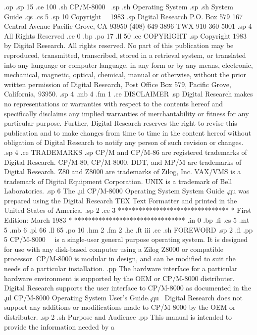 
.op
.sp 15
.ce 100
.sh
CP/M-8000 \ 
.sp
.sh
Operating System
.sp
.sh
System Guide
.qs
.cs 5
.sp 10
Copyright \ \ 1983
.sp
Digital Research
P.O. Box 579
167 Central Avenue
Pacific Grove, CA 93950
(408) 649-3896
TWX 910 360 5001
.sp 4
All Rights Reserved
.ce 0
.bp
.po 17
.ll 50
.ce
COPYRIGHT
.sp
Copyright   1983 by Digital Research.  All rights reserved.
No part of this publication may be reproduced, transmitted,
transcribed, stored in a retrieval system, or translated
into any language or computer language, in any form or
by any means, electronic, mechanical, magnetic, optical,
chemical, manual or otherwise, without the prior written
permission of Digital Research, Post Office Box 579, Pacific
Grove, California, 93950.
.sp 4
.mb 4
.fm 1
.ce
DISCLAIMER
.sp
Digital Research makes no representations or warranties with
respect to the contents hereof and specifically disclaims
any implied warranties of merchantability or fitness for
any particular purpose.  Further, Digital Research reserves the
right to revise this publication and to make changes from
time to time in the content hereof without obligation of
Digital Research to notify any person of such revision or
changes.
.sp 4
.ce
TRADEMARKS
.sp
CP/M and CP/M-86 are registered trademarks of Digital Research.  CP/M-80,
CP/M-8000, DDT, and MP/M are trademarks of Digital Research.  Z80 and
Z8000 are trademarks of Zilog, Inc.  VAX/VMS is 
a trademark of Digital Equipment Corporation.  UNIX is a trademark of 
Bell Laboratories.  
.sp 6
The \c
.ul
CP/M-8000 Operating System System Guide \c
.qu  
was prepared using the Digital Research TEX Text Formatter and printed
in the United States of America.
.sp 2
.ce 3
********************************
*  First Edition:  March 1983  *
********************************
.in 0
.bp
.fi
.cs 5
.mt 5
.mb 6
.pl 66
.ll 65
.po 10
.hm 2
.fm 2
.he 
.ft                            iii
.ce
.sh
FOREWORD
.sp 2
.fi
.pp 5
CP/M-8000 \ \ is a single-user general purpose operating system.  
It is designed for use with any disk-based computer using a Zilog Z8000 or 
compatible processor.  CP/M-8000 is modular in design, and can be modified to 
suit the needs of a particular installation.  
.pp
The hardware interface for a particular hardware environment is supported by 
the OEM or CP/M-8000 distributer.  Digital Research supports the user 
interface to CP/M-8000 as documented in the \c
.ul
CP/M-8000 Operating System User's Guide.\c
.qu
\  Digital Research does not support any additions or modifications made to 
CP/M-8000 by the OEM or distributer.
.sp 2
.sh
Purpose and Audience
.pp
This manual is intended to provide the information needed by a
